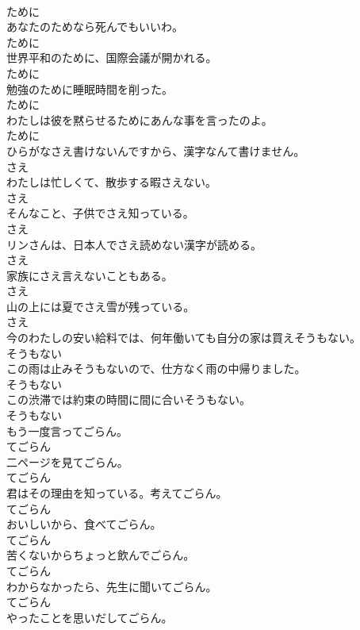 \documentclass[8pt]{extreport}
\begin{document}
\begin{CJK}{UTF8}{min}
\\	ために
\\	あなたのためなら死んでもいいわ。	
\\	ために
\\	世界平和のために、国際会議が開かれる。	
\\	ために
\\	勉強のために睡眠時間を削った。	
\\	ために
\\	わたしは彼を黙らせるためにあんな事を言ったのよ。	
\\	ために
\\	ひらがなさえ書けないんですから、漢字なんて書けません。	
\\	さえ
\\	わたしは忙しくて、散歩する暇さえない。	
\\	さえ
\\	そんなこと、子供でさえ知っている。	
\\	さえ
\\	リンさんは、日本人でさえ読めない漢字が読める。	
\\	さえ
\\	家族にさえ言えないこともある。	
\\	さえ
\\	山の上には夏でさえ雪が残っている。	
\\	さえ
\\	今のわたしの安い給料では、何年働いても自分の家は買えそうもない。	
\\	そうもない
\\	この雨は止みそうもないので、仕方なく雨の中帰りました。	
\\	そうもない
\\	この渋滞では約束の時間に間に合いそうもない。	
\\	そうもない
\\	もう一度言ってごらん。	
\\	てごらん
\\	二ページを見てごらん。	
\\	てごらん
\\	君はその理由を知っている。考えてごらん。	
\\	てごらん
\\	おいしいから、食べてごらん。	
\\	てごらん
\\	苦くないからちょっと飲んでごらん。	
\\	てごらん
\\	わからなかったら、先生に聞いてごらん。	
\\	てごらん
\\	やったことを思いだしてごらん。	

\end{CJK}
\end{document}
